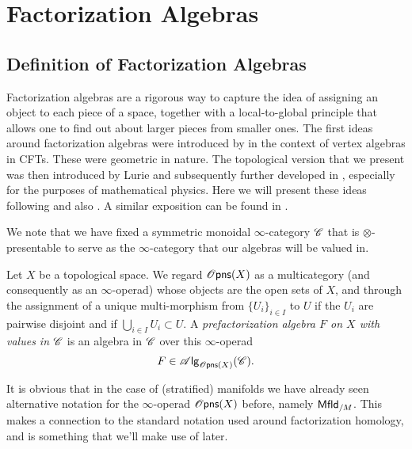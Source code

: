 \documentclass[../text.tex]{subfiles}
\begin{document}
\section{Factorization Algebras}\label{ch:fact_alg}

\subsection{Definition of Factorization Algebras}

Factorization algebras are a rigorous way to capture the idea of assigning an object to each piece of a space, together with a local-to-global principle that allows one to find out about larger pieces from smaller ones. The first ideas around factorization algebras were introduced by \cite{bd2004} in the context of vertex algebras in CFTs. These were geometric in nature. The topological version that we present was then introduced by Lurie and subsequently further developed in \cite{cg2016}, especially for the purposes of mathematical physics. Here we will present these ideas following \cite{cg2016} and also \cite{af_primer}. A similar exposition can be found in \cite{ginot2015}.

\begin{remark}
    We note that we have fixed a symmetric monoidal $\infty$-category $\mathscr{C}$ that is $\otimes$-presentable to serve as the $\infty$-category that our algebras will be valued in.
\end{remark}

\begin{definition}
    Let $X$ be a topological space. We regard $\opens[s](X)$ as a multicategory (and consequently as an $\infty$-operad) whose objects are the open sets of $X$, and through the assignment of a unique multi-morphism from $\{U_i\}_{i \in I}$ to $U$ if the $U_i$ are pairwise disjoint and if $\bigcup_{i \in I} U_i \subset U$. A \emph{prefactorization algebra $F$ on $X$ with values in $\mathscr{C}$} is an algebra in $\mathscr{C}$ over this $\infty$-operad
    \begin{equation}
        F \in \alg{\opens[s](X)}(\catC).
    \end{equation}
\end{definition}

\begin{remark}
    It is obvious that in the case of (stratified) manifolds we have already seen alternative notation for the $\infty$-operad $\opens(X)$ before, namely $\mfld[r]_{/M}$. This makes a connection to the standard notation used around factorization homology, and is something that we'll make use of later.
\end{remark}
\end{document}
